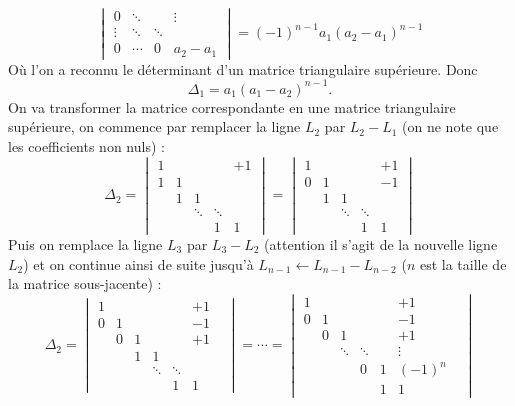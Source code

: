 {{$$\begin{vmatrix}
     0  &\ddots &&\vdots \\
     \vdots &\ddots&\ddots&    \\
     0&\cdots&0   & a_2-a_1
   \end{vmatrix}
= (-1)^{n-1}a_1(a_2-a_1)^{n-1}
$$
Où l'on a reconnu le déterminant d'un matrice triangulaire supérieure.
Donc 
$$\Delta_1 = a_1(a_1-a_2)^{n-1}.$$
On va transformer la matrice correspondante en une matrice triangulaire supérieure,
on commence par remplacer la ligne $L_2$ par $L_2-L_1$ (on ne note que les coefficients non nuls) : 
$$\Delta_2 =   \begin{vmatrix}
  1 &      &    &   &+1 \\
  1 &1      && &  \\
   &1      &1  & &\\
   & &\ddots &\ddots & \\
  &  &       &1      &1
\end{vmatrix}=
 \begin{vmatrix}
  1 &      &    &   &+1 \\
  0 &1      && &  -1\\
   &1      &1  & &\\
   & &\ddots &\ddots & \\
  &  &       &1      &1
\end{vmatrix}
$$
Puis on remplace la ligne $L_3$ par $L_3-L_2$ (attention il s'agit de la nouvelle ligne $L_2$) et on 
continue ainsi de suite jusqu'à $L_{n-1} \leftarrow L_{n-1}-L_{n-2}$ ($n$ est la taille de la matrice sous-jacente) :
$$\Delta_2 =   \begin{vmatrix}
  1 &      &    &   &&+1 \\
  0 &1      && &  &-1\\
    & 0      &1  & & &+1\\
    & & 1      &1  & && \\
   & &&\ddots &\ddots & \\
  &  &       &&1      &1                 
               \end{vmatrix}
= \cdots = 
\begin{vmatrix}
  1 &      &    &   &&+1 \\
  0 &1      && &  &-1\\
    & 0      &1  & & &+1\\
    & & \ddots      &\ddots  & &\vdots& \\
   & &&0 &1 & (-1)^{n} \\
  &  &       &&1      &1                 
               \end{vmatrix}
$$}}
